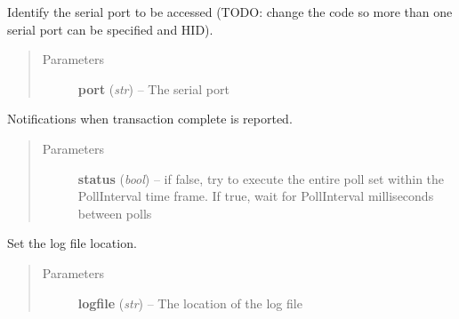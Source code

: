 \documentclass[letterpaper,10pt,english]{sphinxmanual}
\begin{document}
\begin{fulllineitems}
\begin{fulllineitems}
\end{fulllineitems}


\begin{fulllineitems}
\label{option:openzwave.option.ZWaveOption.set_interface}
Identify the serial port to be accessed (TODO: change the code so more than one serial port can be specified and HID).
\begin{quote}\begin{description}
\item[{Parameters}] \leavevmode
\textbf{port} (\emph{str}) -- The serial port

\end{description}\end{quote}

\end{fulllineitems}


\begin{fulllineitems}
\label{option:openzwave.option.ZWaveOption.set_interval_between_polls}
Notifications when transaction complete is reported.
\begin{quote}\begin{description}
\item[{Parameters}] \leavevmode
\textbf{status} (\emph{bool}) -- if false, try to execute the entire poll set within the PollInterval time frame. If true, wait for PollInterval milliseconds between polls

\end{description}\end{quote}

\end{fulllineitems}


\begin{fulllineitems}
\label{option:openzwave.option.ZWaveOption.set_log_file}
Set the log file location.
\begin{quote}\begin{description}
\item[{Parameters}] \leavevmode
\textbf{logfile} (\emph{str}) -- The location of the log file


\end{description}
\end{quote}
\end{fulllineitems}
\end{fulllineitems}
\end{document}
